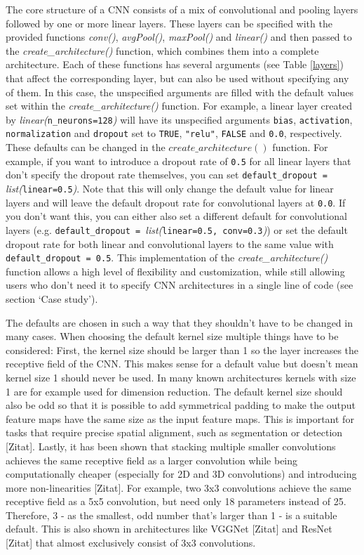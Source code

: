 \documentclass{article}
\newcommand{\pkg}[1]{`#1'}
\newcommand{\fn}[2][]{\textit{#2(}#1\textit{)}}
\newcommand{\val}[1]{\texttt{#1}}
\begin{document}
The core structure of a CNN consists of a mix of convolutional and pooling layers followed by one or more linear layers. These layers can be specified with the provided functions \fn{conv}, \fn{avgPool}, \fn{maxPool} and \fn{linear} and then passed to the \fn{create\_architecture} function, which combines them into a complete architecture. Each of these functions has several arguments (see Table \ref{layers}) that affect the corresponding layer, but can also be used without specifying any of them. In this case, the unspecified arguments are filled with the default values set within the \fn{create\_architecture} function. For example, a linear layer created by \fn[\val{n\_neurons=128}]{linear} will have its unspecified arguments \val{bias}, \val{activation}, \val{normalization} and \val{dropout} set to \val{TRUE}, \val{"relu"}, \val{FALSE} and \val{0.0}, respectively. These defaults can be changed in the $create\_architecture()$ function. For example, if you want to introduce a dropout rate of \val{0.5} for all linear layers that don't specify the dropout rate themselves, you can set \val{default\_dropout = }\fn[\val{linear=0.5}]{list}. Note that this will only change the default value for linear layers and will leave the default dropout rate for convolutional layers at \val{0.0}. If you don't want this, you can either also set a different default for convolutional layers (e.g. \val{default\_dropout = }\fn[\val{linear=0.5, conv=0.3}]{list}) or set the default dropout rate for both linear and convolutional layers to the same value with \val{default\_dropout = 0.5}. This implementation of the \fn{create\_architecture} function allows a high level of flexibility and customization, while still allowing users who don't need it to specify CNN architectures in a single line of code (see section \pkg{Case study}).

The defaults are chosen in such a way that they shouldn't have to be changed in many cases. When choosing the default kernel size multiple things have to be considered: First, the kernel size should be larger than 1 so the layer increases the receptive field of the CNN. This makes sense for a default value but doesn't mean kernel size 1 should never be used. In many known architectures kernels with size 1 are for example used for dimension reduction. The default kernel size should also be odd so that it is possible to add symmetrical padding to make the output feature maps have the same size as the input feature maps. This is important for tasks that require precise spatial alignment, such as segmentation or detection [Zitat]. Lastly, it has been shown that stacking multiple smaller convolutions achieves the same receptive field as a larger convolution while being computationally cheaper (especially for 2D and 3D convolutions) and introducing more non-linearities [Zitat]. For example, two 3x3 convolutions achieve the same receptive field as a 5x5 convolution, but need only 18 parameters instead of 25. Therefore, 3 - as the smallest, odd number that's larger than 1 - is a suitable default. This is also shown in architectures like VGGNet [Zitat] and ResNet [Zitat] that almost exclusively consist of 3x3 convolutions.
\end{document}
